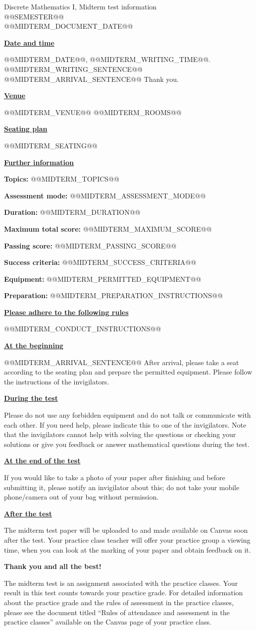 \documentclass[11pt,a4paper]{article}
\newcommand{\heading}[1]{\par\medskip\textbf{\underline{#1}}\par}
\begin{document}
\begin{center}\large
Discrete Mathematics I, Midterm test information\\
@@SEMESTER@@\\
@@MIDTERM_DOCUMENT_DATE@@
\end{center}

\heading{Date and time}
@@MIDTERM_DATE@@, @@MIDTERM_WRITING_TIME@@.
@@MIDTERM_WRITING_SENTENCE@@
@@MIDTERM_ARRIVAL_SENTENCE@@
Thank you.

\heading{Venue}
@@MIDTERM_VENUE@@
@@MIDTERM_ROOMS@@

\heading{Seating plan}
@@MIDTERM_SEATING@@

\heading{Further information}
\textbf{Topics:} @@MIDTERM_TOPICS@@\par
\textbf{Assessment mode:} @@MIDTERM_ASSESSMENT_MODE@@\par
\textbf{Duration:} @@MIDTERM_DURATION@@\par
\textbf{Maximum total score:} @@MIDTERM_MAXIMUM_SCORE@@\par
\textbf{Passing score:} @@MIDTERM_PASSING_SCORE@@\par
\textbf{Success criteria:} @@MIDTERM_SUCCESS_CRITERIA@@\par
\textbf{Equipment:} @@MIDTERM_PERMITTED_EQUIPMENT@@\par
\textbf{Preparation:} @@MIDTERM_PREPARATION_INSTRUCTIONS@@

\heading{Please adhere to the following rules}
@@MIDTERM_CONDUCT_INSTRUCTIONS@@

\heading{At the beginning}
@@MIDTERM_ARRIVAL_SENTENCE@@
After arrival, please take a seat according to the seating plan and prepare the
permitted equipment. Please follow the instructions of the invigilators.

\heading{During the test}
Please do not use any forbidden equipment and do not talk or communicate with each
other. If you need help, please indicate this to one of the invigilators. Note that
the invigilators cannot help with solving the questions or checking your solutions
or give you feedback or answer mathematical questions during the test.

\heading{At the end of the test}
If you would like to take a photo of your paper after finishing and before
submitting it, please notify an invigilator about this; do not take your mobile
phone/camera out of your bag without permission.

\heading{After the test}
The midterm test paper will be uploaded to and made available on Canvas soon after
the test. Your practice class teacher will offer your practice group a viewing
time, when you can look at the marking of your paper and obtain feedback on it.

\textbf{Thank you and all the best!}

The midterm test is an assignment associated with the practice classes. Your result
in this test counts towards your practice grade. For detailed information about the
practice grade and the rules of assessment in the practice classes, please see the
document titled ``Rules of attendance and assessment in the practice classes''
available on the Canvas page of your practice class.
\end{document}
